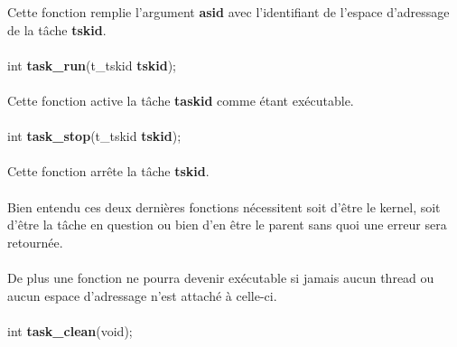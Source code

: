 \documentclass[10pt,a4wide]{article}
\begin{document}
Cette fonction remplie l'argument \textbf{asid} avec l'identifiant de
l'espace d'adressage de la t\^ache \textbf{tskid}.

\paragraph{}

\hspace{1.5cm}int \textbf{task\_run}(t\_tskid \textbf{tskid});

\paragraph{}

Cette fonction active la t\^ache \textbf{taskid} comme \'etant ex\'ecutable.

\paragraph{}

\hspace{1.5cm}int \textbf{task\_stop}(t\_tskid \textbf{tskid});

\paragraph{}

Cette fonction arr\^ete la t\^ache \textbf{tskid}.

\paragraph{}

Bien entendu ces deux derni\`eres fonctions n\'ecessitent soit
d'\^etre le kernel, soit d'\^etre la t\^ache en question ou bien d'en
\^etre le parent sans quoi une erreur sera retourn\'ee.

\paragraph{}

De plus une fonction ne pourra devenir ex\'ecutable si jamais aucun
thread ou aucun espace d'adressage n'est attach\'e \`a celle-ci.

\paragraph{}

\hspace{1.5cm}int \textbf{task\_clean}(void);
\end{document}
